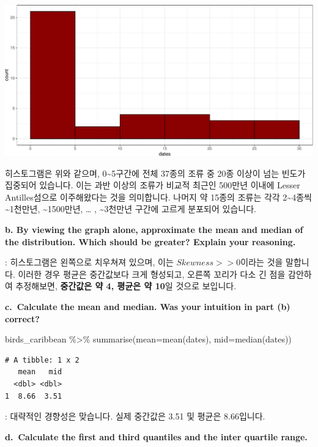 \documentclass[
  letterpaper,
  DIV=11,
  numbers=noendperiod]{scrreprt}
\newenvironment{Shaded}{\begin{snugshade}}{\end{snugshade}}
\newcommand{\AttributeTok}[1]{\textcolor[rgb]{0.40,0.45,0.13}{#1}}
\newcommand{\FunctionTok}[1]{\textcolor[rgb]{0.28,0.35,0.67}{#1}}
\newcommand{\NormalTok}[1]{\textcolor[rgb]{0.00,0.23,0.31}{#1}}
\newcommand{\SpecialCharTok}[1]{\textcolor[rgb]{0.37,0.37,0.37}{#1}}
\begin{document}
\includegraphics{경영통계분석_hw1_files/figure-pdf/unnamed-chunk-3-1.pdf}

히스토그램은 위와 같으며, 0\textasciitilde5구간에 전체 37종의 조류 중
20종 이상이 넘는 빈도가 집중되어 있습니다. 이는 과반 이상의 조류가
비교적 최근인 500만년 이내에 Lesser Antilles섬으로 이주해왔다는 것을
의미합니다. 나머지 약 15종의 조류는 각각 2\textasciitilde4종씩
\textasciitilde1천만년, \textasciitilde1500만년, \ldots{} ,
\textasciitilde3천만년 구간에 고르게 분포되어 있습니다.

\textbf{b. By viewing the graph alone, approximate the mean and median
of the distribution. Which should be greater? Explain your reasoning.}

: 히스토그램은 왼쪽으로 치우쳐져 있으며, 이는 \(Skewness>>0\)이라는 것을
말합니다. 이러한 경우 평균은 중간값보다 크게 형성되고, 오른쪽 꼬리가
다소 긴 점을 감안하여 추정해보면, \textbf{중간값은 약 4, 평균은 약 10}일
것으로 보입니다.

\textbf{c.~Calculate the mean and median. Was your intuition in part (b)
correct?}

\begin{Shaded}
\begin{Highlighting}[]
\NormalTok{birds\_caribbean }\SpecialCharTok{\%\textgreater{}\%} 
  \FunctionTok{summarise}\NormalTok{(}\AttributeTok{mean=}\FunctionTok{mean}\NormalTok{(dates),}
            \AttributeTok{mid=}\FunctionTok{median}\NormalTok{(dates))}
\end{Highlighting}
\end{Shaded}

\begin{verbatim}
# A tibble: 1 x 2
   mean   mid
  <dbl> <dbl>
1  8.66  3.51
\end{verbatim}

: 대략적인 경향성은 맞습니다. 실제 중간값은 3.51 및 평균은 8.66입니다.

\textbf{d.~Calculate the first and third quantiles and the inter
quartile range.}
\end{document}
